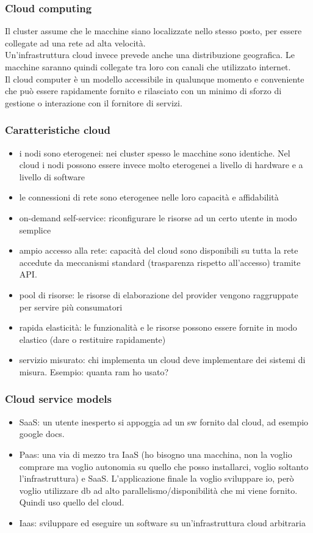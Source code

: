 \subsubsection{Cloud computing}
Il cluster assume che le macchine siano localizzate nello stesso posto, per essere collegate ad una rete ad alta velocità.\\ Un'infrastruttura cloud invece prevede anche una distribuzione geografica. Le macchine saranno quindi collegate tra loro con canali che utilizzato internet.\\
Il cloud computer è un modello accessibile in qualunque momento e conveniente che può essere rapidamente fornito e rilasciato con un minimo di sforzo di gestione o interazione con il fornitore di servizi.

\subsubsection{Caratteristiche cloud}
\begin{itemize}
    \item i nodi sono eterogenei: nei cluster spesso le macchine sono identiche. Nel cloud i nodi possono essere invece molto eterogenei a livello di hardware e a livello di software
    \item le connessioni di rete sono eterogenee nelle loro capacità e affidabilità 
    \item on-demand self-service: riconfigurare le risorse ad un certo utente in modo semplice
    \item ampio accesso alla rete: capacità del cloud sono disponibili su tutta la rete accedute da meccanismi standard (trasparenza rispetto all'accesso) tramite API.
    \item pool di risorse: le risorse di elaborazione del provider vengono raggruppate per servire più consumatori
    \item rapida elasticità: le funzionalità e le risorse possono essere fornite in modo elastico (dare o restituire rapidamente)
    \item servizio misurato: chi implementa un cloud deve implementare dei sistemi di misura. Esempio: quanta ram ho usato?

\end{itemize}


\subsubsection{Cloud service models}
\begin{itemize}
    \item SaaS: un utente inesperto si appoggia ad un sw fornito dal cloud, ad esempio google docs.
    \item Paas: una via di mezzo tra IaaS (ho bisogno una macchina, non la voglio comprare ma voglio autonomia su quello che posso installarci, voglio soltanto l'infrastruttura) e SaaS. L'applicazione finale la voglio sviluppare io, però voglio utilizzare db ad alto parallelismo/disponibilità che mi viene fornito. Quindi uso quello del cloud. 
    \item Iaas: sviluppare ed eseguire un software su un'infrastruttura cloud arbitraria 
\end{itemize}


